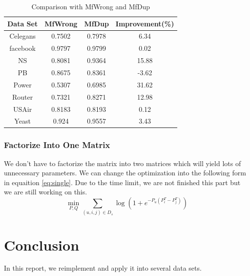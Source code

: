 \documentclass[12pt]{article}
\begin{document}
\begin{table}
	\begin{center}
		\begin{tabular}{|c|c|c|c|}
			\hline
			Data Set & MfWrong & MfDup & Improvement(\%) \\
			\hline
			Celegans&0.7502&0.7978&6.34\\
			facebook&0.9797&0.9799&0.02\\
			NS&0.8081&0.9364&15.88\\
			PB&0.8675&0.8361&-3.62\\
			Power&0.5307&0.6985&31.62\\
			Router&0.7321&0.8271&12.98\\
			USAir&0.8183&0.8193&0.12\\
			Yeast&0.924&0.9557&3.43\\
			\hline
		\end{tabular}
	\end{center}
	\caption{Comparison with MfWrong and MfDup}
	\label{tab:dup}
\end{table}

\subsubsection{Factorize Into One Matrix}
We don't have to factorize the matrix into two matrices which will yield lots of unnecessary parameters. We can change the optimization into the following form in equaition \ref{eq:single}. Due to the time limit, we are not finished this part but we are still working on this.
\begin{equation}
\min_{P,Q} \sum_{(u,i,j)\in D_s}\log(1+e^{-P_u(P_i^T - P_j^T)})
\label{eq:single}
\end{equation}

\section{Conclusion}
In this report, we reimplement and apply it into several data sets. 





	
\end{document}
